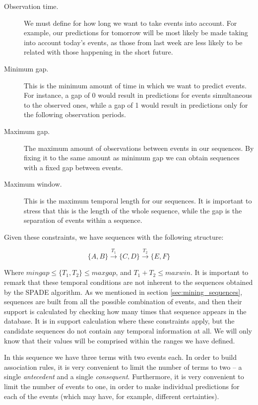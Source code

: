 \documentclass[a4paper,12pt]{article}
\begin{document}
\begin{description}
\item[Observation time.] We must define for how long we want to take events into account. For example, our predictions for tomorrow will be most likely be made taking into account today's events, as those from last week are less likely to be related with those happening in the short future.
\item[Minimum gap.] This is the minimum amount of time in which we want to predict events. For instance, a gap of 0 would result in predictions for events simultaneous to the observed ones, while a gap of 1 would result in predictions only for the following observation periods.
\item[Maximum gap.] The maximum amount of observations between events in our sequences. By fixing it to the same amount as minimum gap we can obtain sequences with a fixed gap between events.
\item[Maximum window.] This is the maximum temporal length for our sequences. It is important to stress that this is the length of the whole sequence, while the gap is the separation of events within a sequence.
\end{description}

Given these constraints, we have sequences with the following structure:

$$\{A, B\} \xrightarrow{T_1} \{C, D\} \xrightarrow{T_2} \{E, F\}$$

Where $mingap \leq \{T_1, T_2\} \leq maxgap$, and $T_1+T_2 \leq maxwin$. It is important to remark that these temporal conditions are not inherent to the sequences obtained by the SPADE algorithm. As we mentioned in section \ref{sec:mining_sequences}, sequences are built from all the possible combination of events, and then their support is calculated by checking how many times that sequence appears in the database. It is in support calculation where these constraints apply, but the candidate sequences do not contain any temporal information at all. We will only know that their values will be comprised within the ranges we have defined.

In this sequence we have three terms with two events each. In order to build association rules, it is very convenient to limit the number of terms to two -- a single \emph{antecedent} and a single \emph{consequent}. Furthermore, it is very convenient to limit the number of events to one, in order to make individual predictions for each of the events (which may have, for example, different certainties). 
\end{document}
